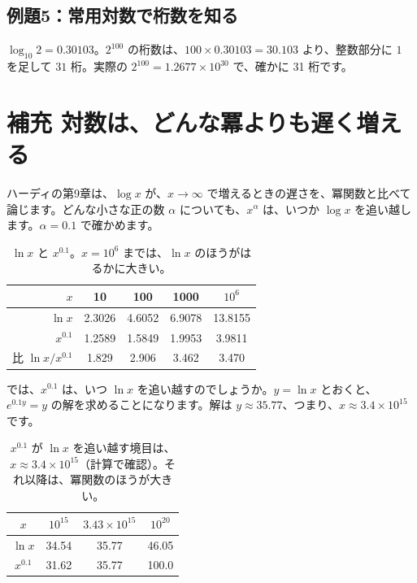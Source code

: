 \documentclass[a4paper,11pt,openany]{ltjsbook}
\begin{document}
\subsection*{例題5：常用対数で桁数を知る}

$\log_{10}2=0.30103$。$2^{100}$ の桁数は、$100\times0.30103=30.103$ より、整数部分に $1$ を足して $31$ 桁。実際の $2^{100}=1.2677\times10^{30}$ で、確かに 31 桁です。

\section{補充 対数は、どんな冪よりも遅く増える}

ハーディの第9章は、$\log x$ が、$x\to\infty$ で増えるときの遅さを、冪関数と比べて論じます。どんな小さな正の数 $\alpha$ についても、$x^\alpha$ は、いつか $\log x$ を追い越します。$\alpha=0.1$ で確かめます。

\begin{table}[htbp]
\centering
\begin{tabular}{r|cccc}
\toprule
$x$ & 10 & 100 & 1000 & $10^6$\\
\midrule
$\ln x$ & 2.3026 & 4.6052 & 6.9078 & 13.8155\\
$x^{0.1}$ & 1.2589 & 1.5849 & 1.9953 & 3.9811\\
比 $\ln x\big/x^{0.1}$ & 1.829 & 2.906 & 3.462 & 3.470\\
\bottomrule
\end{tabular}
\caption{$\ln x$ と $x^{0.1}$。$x=10^6$ までは、$\ln x$ のほうがはるかに大きい。}
\end{table}

では、$x^{0.1}$ は、いつ $\ln x$ を追い越すのでしょうか。$y=\ln x$ とおくと、$e^{0.1y}=y$ の解を求めることになります。解は $y\approx35.77$、つまり、$x\approx3.4\times10^{15}$ です。

\begin{table}[htbp]
\centering
\begin{tabular}{c|ccc}
\toprule
$x$ & $10^{15}$ & $3.43\times10^{15}$ & $10^{20}$\\
\midrule
$\ln x$ & 34.54 & 35.77 & 46.05\\
$x^{0.1}$ & 31.62 & 35.77 & 100.0\\
\bottomrule
\end{tabular}
\caption{$x^{0.1}$ が $\ln x$ を追い越す境目は、$x\approx3.4\times10^{15}$（計算で確認）。それ以降は、冪関数のほうが大きい。}
\end{table}
\end{document}
